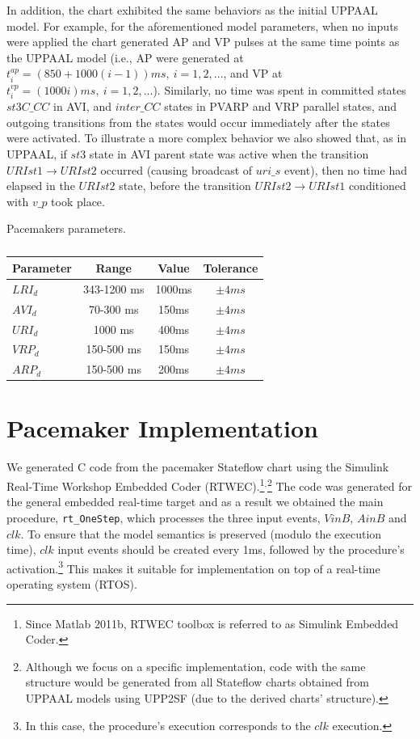 In addition, the chart exhibited the same behaviors as the initial UPPAAL model. For example, for the aforementioned model parameters, when no inputs were applied the chart generated AP and VP pulses at the same time points as the UPPAAL model (i.e., AP were generated at  $t^{ap}_i=(850+1000(i-1))ms,~i=1,2, ...$, and VP at $t^{vp}_i=(1000i)ms,~i=1,2, ...$). 
Similarly, no time was spent in committed states $st3C\_CC$ in AVI, and $inter\_CC$ states in PVARP and VRP parallel states, and outgoing transitions from the states would occur immediately after the states were activated. To illustrate a more complex behavior we also showed that, as in UPPAAL, if $st3$ state in AVI parent state was active when the transition $URIst1\rightarrow URIst2$ occurred (causing broadcast of $uri\_s$ event), then no time had elapsed in the $URIst2$ state, before the transition $URIst2\rightarrow URIst1$ conditioned with $v\_p$ took place.


\begin{table}[!b]
Pacemakers parameters.

{
\begin{tabular}{|l|c|c|c|}
\hline
Parameter & Range & Value & Tolerance \\ 
\hline
$LRI_{d}$ & 343-1200 ms & 1000ms & $\pm 4ms$  \\\hline
$AVI_{d}$ & 70-300 ms   &  150ms & $\pm 4ms$  \\\hline
$URI_{d}$ & 1000 ms     &  400ms & $\pm 4ms$  \\\hline
$VRP_{d}$ & 150-500 ms  &  150ms & $\pm 4ms$  \\\hline
$ARP_{d}$ & 150-500 ms  &  200ms & $\pm 4ms$  \\\hline
\end{tabular}}
\caption{}
\label{tab:params}
\end{table}

\section{Pacemaker Implementation}
\label{sec:code}


We generated C code from the pacemaker Stateflow chart using the Simulink Real-Time Workshop Embedded Coder (RTWEC).\footnote{Since Matlab 2011b, RTWEC toolbox is referred to as Simulink Embedded Coder.}$^,$\footnote{Although we focus on a specific implementation, code with the same structure would be generated from all Stateflow charts obtained from UPPAAL models using UPP2SF (due to the derived charts' structure).} 
The code was generated for the general embedded real-time target and as a result we obtained the main procedure, \texttt{rt\_OneStep}, which processes the three input events, $VinB$, $AinB$ and $clk$. To ensure that the model semantics is preserved (modulo the execution time), $clk$ input events should be created every 1ms, followed by the procedure's activation.\footnote{In this case, the procedure's execution corresponds to the $clk$ execution.}  This makes it suitable for implementation on top of a real-time operating system (RTOS).

